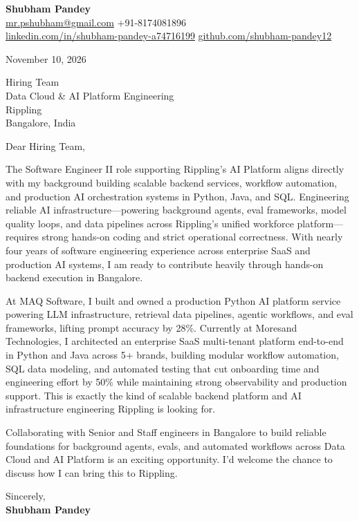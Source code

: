\documentclass[a4paper,11pt]{article}
\begin{document}
\textbf{\Large Shubham Pandey}\\
\href{mailto:mr.pshubham@gmail.com}{mr.pshubham@gmail.com} \quad +91-8174081896\\
\href{https://www.linkedin.com/in/shubham-pandey-a74716199/}{linkedin.com/in/shubham-pandey-a74716199} \quad
\href{https://github.com/shubham-pandey12}{github.com/shubham-pandey12}

\vspace{1em}
November 10, 2026

\vspace{1em}
Hiring Team\\
Data Cloud \& AI Platform Engineering\\
Rippling\\
Bangalore, India

\vspace{1em}
Dear Hiring Team,

The Software Engineer II role supporting Rippling's AI Platform aligns directly with my background building scalable backend services, workflow automation, and production AI orchestration systems in Python, Java, and SQL. Engineering reliable AI infrastructure---powering background agents, eval frameworks, model quality loops, and data pipelines across Rippling's unified workforce platform---requires strong hands-on coding and strict operational correctness. With nearly four years of software engineering experience across enterprise SaaS and production AI systems, I am ready to contribute heavily through hands-on backend execution in Bangalore.

At MAQ Software, I built and owned a production Python AI platform service powering LLM infrastructure, retrieval data pipelines, agentic workflows, and eval frameworks, lifting prompt accuracy by 28\%. Currently at Moresand Technologies, I architected an enterprise SaaS multi-tenant platform end-to-end in Python and Java across 5+ brands, building modular workflow automation, SQL data modeling, and automated testing that cut onboarding time and engineering effort by 50\% while maintaining strong observability and production support. This is exactly the kind of scalable backend platform and AI infrastructure engineering Rippling is looking for.

Collaborating with Senior and Staff engineers in Bangalore to build reliable foundations for background agents, evals, and automated workflows across Data Cloud and AI Platform is an exciting opportunity. I'd welcome the chance to discuss how I can bring this to Rippling.

\vspace{1em}
Sincerely,\\[0.5em]
\textbf{Shubham Pandey}
\end{document}
